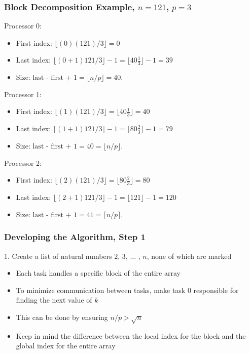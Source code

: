\documentclass[13pt]{beamer}
\begin{document}
\begin{frame}
\frametitle{Block Decomposition Example, $n = 121$, $p = 3$}
    \alert{Processor 0:}
    \begin{itemize}
    \item First index: $\lfloor (0) (121) / 3 \rfloor = 0$
    \item Last index: $\lfloor (0 + 1) 121 / 3 \rfloor - 1 = \lfloor 40\frac{1}{3} \rfloor - 1 = 39$
    \item Size: $\text{last - first + 1} = \lfloor n / p \rfloor = 40$.
    \end{itemize}

    \alert{Processor 1:}
    \begin{itemize}
    \item First index: $\lfloor (1) (121) / 3 \rfloor = \lfloor 40\frac{1}{3} \rfloor = 40$
    \item Last index: $\lfloor (1 + 1) 121 / 3 \rfloor - 1 = \lfloor 80\frac{2}{3} \rfloor - 1 = 79$
    \item Size: $\text{last - first + 1} = 40 = \lfloor n / p \rfloor$.
    \end{itemize}

    \alert{Processor 2:}
    \begin{itemize}
    \item First index: $\lfloor (2) (121) / 3 \rfloor = \lfloor 80\frac{2}{3} \rfloor = 80$
    \item Last index: $\lfloor (2 + 1) 121 / 3 \rfloor - 1 = \lfloor 121 \rfloor - 1 = 120$
    \item Size: $\text{last - first + 1} = 41 = \lceil n / p \rceil$.
    \end{itemize}

\end{frame}

\begin{frame}
\frametitle{Developing the Algorithm, Step 1}
\alert{1. Create a list of natural numbers $2$, $3$, ... , $n$, none of which are marked}
\begin{itemize}
  \item Each task handles a specific block of the entire array
  \item To minimize communication between tasks, make task 0 responsible for finding the next value of $k$
  \item This can be done by ensuring $n/p > \sqrt{n}$
  \item Keep in mind the difference between the local index for the block and the global index for the entire array
\end{itemize}
\end{frame}
\end{document}
